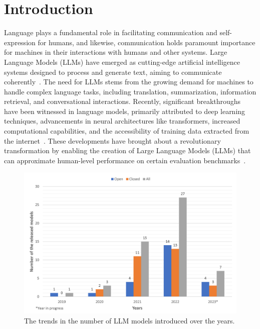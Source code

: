 \section{Introduction}

Language plays a fundamental role in facilitating communication and self-expression for humans, and likewise, communication holds paramount importance for machines in their interactions with humans and other systems. Large Language Models (LLMs) have emerged as cutting-edge artificial intelligence systems designed to process and generate text, aiming to communicate coherently~\cite{y2022large}. The need for LLMs stems from the growing demand for machines to handle complex language tasks, including translation, summarization, information retrieval, and conversational interactions. 
Recently, significant breakthroughs have been witnessed in language models, primarily attributed to deep learning techniques, advancements in neural architectures like transformers, increased computational capabilities, and the accessibility of training data extracted from the internet~\cite{chernyavskiy2021transformers}. These developments have brought about a revolutionary transformation by enabling the creation of Large Language Models (LLMs) that can approximate human-level performance on certain evaluation benchmarks~\cite{wang2019superglue,adiwardana2020towards}. 


\begin{figure}[tbp]
\centering
\includegraphics[width=1\columnwidth]{Figure/Column_Chart.png}
\caption{The trends in the number of LLM models introduced over the years.}
\label{fig:num_LLMs_barchart}
\end{figure}

